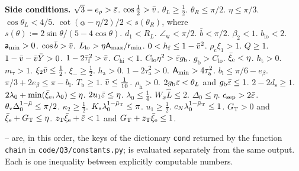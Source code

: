 \noindent\textbf{Side conditions.} {\small
{} $\sqrt3-e_\rho>\bar\varepsilon$.  $\cos\frac12>\bar v$.  $\theta_L\ge\frac12$.  $\theta_R\le\pi/2$.  $\eta\le\pi/3$.
 $\cos\theta_L<4/5$.  $\cot(\underline\alpha-\eta/2)/2<s(\theta_R)$, where $s(\theta):=2\sin\theta/(5-4\cos\theta)$.
 $d_1<R_L$.  $\angle_{\mathrm w}<\pi/2$.  $\bar b<\pi/2$.  $\beta_2<1$.  $b_{\mathrm{lo}}<2$.
 $\mathsf a_{\min}>0$.  $\cos\bar b>\bar v$.  $L_{\mathrm{lo}}>\eta\mathsf A_{\max}/\mathsf r_{\min}$.
 $0<h_{\mathrm f}\le1-\bar v^2$.  $\rho_{\mathrm c}\xi_1>1$.  $Q\ge1$.  $1-\bar v-\bar v\bar Y>0$.
 $1-2\bar\tau_{\mathrm f}^2>\bar v$.  $C_{\mathrm{hi}}<1$.  $C_{\mathrm{lo}}\eta^2>\bar\varepsilon g_{\mathrm b}$.
 $g_{\mathrm b}>C_{\mathrm{lo}}$.  $\bar\xi_{\mathrm e}<\eta$.  $h_{\mathrm t}>0$.  $m_\tau>1$.
 $\xi_2\bar v\le\frac12$.  $\xi_-\ge\frac12$.  $h_{\mathrm a}>0$.  $1-2\tau_{\mathrm a}^2>0$.
 $\mathsf A_{\min}>4\tau_{\mathrm a}^2$.  $b_{\mathrm l}\le\pi/6-e_\beta$.  $\pi/3+2e_\beta\le\pi-b_{\mathrm l}$.
 $T_{\mathrm b}\ge1$.  $\bar v\le\frac1{10}$.  $\rho_{\mathrm h}>0$.  $2g_{\mathrm b}\bar\varepsilon<\theta_L$ and
$g_{\mathrm b}\bar\varepsilon\le1$.  $2-2d_{\mathrm s}\ge1$.  $2\lambda_0+\min(\bar\xi_{\mathrm e},\lambda_0)\le\eta$. 
$2u_1\bar\varepsilon\le\eta$.  $\lambda_0\le\frac14$.  $W_x\hat L\le2$.  $\Delta_0\le\eta$. 
$c_{\mathrm{sep}}>2\bar\varepsilon$.  $\theta_{\mathrm v}\Delta_0^{1-\bar\mu}\le\pi/2$.  $\kappa_2\ge\frac12$. 
$K_*\lambda_0^{1-\bar\mu_{\mathrm T}}\le\pi$.  $u_1\ge\frac12$.  $c_N\lambda_0^{1-\bar\mu_{\mathrm T}}\le1$.  $G_{\mathrm T}>0$ and
$\bar\xi_{\mathrm e}+G_{\mathrm T}\le\eta$.  $z_{\mathrm T}\bar\xi_{\mathrm e}+\bar\varepsilon<1$ and $G_{\mathrm T}+z_{\mathrm T}\bar\xi_{\mathrm e}\le1$.}

\medskip
{}-- are, in this order, the keys of the dictionary \texttt{cond} returned by the function \texttt{chain} in
\texttt{code/Q3/constants.py};  is evaluated separately from the same output. Each is one inequality between explicitly computable numbers.


